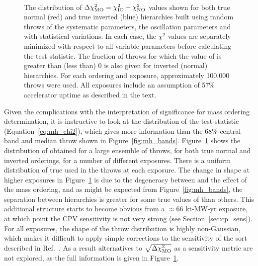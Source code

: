 \begin{figure*}[htbp]
  \centering
  \\
  \caption{The distribution of $\Delta\chi^{2}_{\mathrm{MO}} = \chi^{2}_{\mathrm{IO}} - \chi^{2}_{\mathrm{NO}}$ values shown for both true normal (red) and true inverted (blue) hierarchies built using random throws of the systematic parameters, the oscillation parameters and with statistical variations. In each case, the $\chi^{2}$ values are separately minimized with respect to all variable parameters before calculating the test statistic. The fraction of throws for which the value of \dchisqMO is greater than (less than) 0 is also given for inverted (normal) hierarchies. For each ordering and exposure, approximately 100,000 throws were used. All exposures include an assumption of 57\% accelerator uptime as described in the text.}
  \label{fig:mh_comp_over_time}
\end{figure*}
Given the complications with the interpretation of significance for mass ordering determination, it is instructive to look at the distribution of the test-statistic (Equation~\ref{eq:mh_chi2}), which gives more information than the 68\% central band and median throw shown in Figure~\ref{fig:mh_bands}. Figure~\ref{fig:mh_comp_over_time} shows the distribution of \dchisqMO obtained for a large ensemble of throws, for both true normal and inverted orderings, for a number of different exposures. There is a uniform distribution of true \deltacp used in the throws at each exposure. The change in shape at higher exposures in Figure~\ref{fig:mh_comp_over_time} is due to the degeneracy between \deltacp and the effect of the mass ordering, and as might be expected from Figure~\ref{fig:mh_bands}, the separation between hierarchies is greater for some true values of \deltacp than others. This additional structure starts to become obvious from a $\approx$66 kt-MW-yr exposure, at which point the CPV sensitivity is not very strong (see Section~\ref{sec:cp_sens}). For all exposures, the shape of the throw distribution is highly non-Gaussian, which makes it difficult to apply simple corrections to the sensitivity of the sort described in Ref.~\cite{Blennow:2013oma}. As a result alternatives to $\sqrt{\Delta\chi^{2}_{\mathrm{MO}}}$ as a sensitivity metric are not explored, as the full information is given in Figure~\ref{fig:mh_comp_over_time}.

